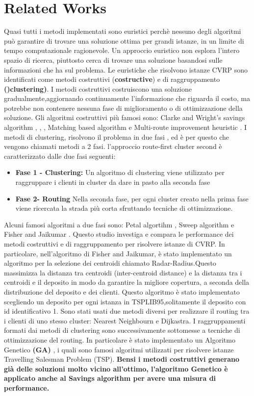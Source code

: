\documentclass[]{article}
\begin{document}
\section{Related Works}
Quasi tutti i metodi implementati sono euristici perchè nessuno degli algoritmi può garantire di trovare una soluzione ottima per grandi istanze, in un limite di tempo computazionale ragionevole.
Un approccio euristico non esplora l'intero spazio di ricerca, piuttosto cerca di trovare una soluzione basandosi sulle informazioni che ha sul problema.
Le euristiche che risolvono istanze CVRP sono identificati come metodi costruttivi (\textbf{costructive}) e di raggruppamento \textbf{()clustering)}.
I metodi costruttivi costruiscono una soluzione gradualmente,aggiornando continuamente l'informazione che riguarda il costo, ma potrebbe non contenere nessuna fase di miglioramento o di ottimizzazione della soluzione.
Gli algoritmi costruttivi più famosi sono: Clarke and Wright's savings algorithm \cite{CK1}, \cite{CK2} , \cite{CK3} , Matching based algorithm e Multi-route improvement heuristic \cite{CK3}.
I metodi di clustering, risolvono il problema in due fasi , ed è per questo che vengono chiamati metodi a 2 fasi.  l'approccio route-first cluster second è caratterizzato dalle due fasi seguenti:
\begin{itemize}
\item \textbf{Fase 1 - Clustering:} Un algoritmo di clustering viene utilizzato per raggruppare i clienti in cluster da dare in pasto alla seconda fase
\item \textbf{Fase 2- Routing} Nella seconda fase, per ogni cluster creato nella prima fase viene ricercata la strada più corta sfruttando tecniche di ottimizzazione.
\end{itemize}
Alcuni famosi algoritmi a due fasi sono: Petal algortihm \cite{petal}, Sweep algorithm \cite{sweep} e Fisher and Jaikumar \cite{FJ}.
Questo studio investiga e compara le performance dei metodi costruttivi e di raggruppamento per risolvere istanze di CVRP.
In particolare, nell'algoritmo di Fisher and Jaikumar, è stato implementato un algoritmo per la selezione dei centroidi chiamato Radar-Radius.Questo  massimizza la distanza tra centroidi (inter-centroid distance) e la distanza tra i centroidi e il deposito in modo da garantire la migliore copertura, a seconda della distribuzione del deposito e dei clienti.
Questo algoritmo è stato implementato scegliendo un deposito per ogni istanza in TSPLIB95,solitamente il deposito con id identificativo 1.
Sono stati usati due metodi diversi per realizzare il routing tra i clienti di uno stesso cluster: Nearest Neighbourn e Dijkastra.
I raggruppamenti formati dai metodi di clustering sono successivamente sottomesse a tecniche di ottimizzazione del routing.
In particolare è stato implementato un Algoritmo Genetico  \textbf{(GA)} \cite{GA}, i quali sono famosi algoritmi utilizzati per risolvere istanze Travelling Salesman Problem (TSP).
\textbf{Bensi i metodi costruttivi generano già delle soluzioni molto vicino all'ottimo, l'algoritmo Genetico è applicato anche al Savings algorithm per avere una misura di performance.}
\end{document}
